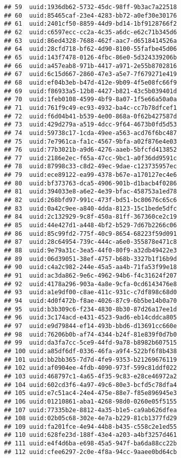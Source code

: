 \documentclass[
]{article}
\begin{document}
\begin{verbatim}
## 59  uuid:1936db62-5732-45dc-98ff-9b3ac7a22518
## 60  uuid:85465caf-23e4-4283-bb72-a0ef30e30176
## 61  uuid:2401cf50-8859-44d9-bd14-1bf9128766f2
## 62  uuid:c6597ecc-cc2a-4c35-a6dc-e62c71b345d6
## 63  uuid:86ed4328-7688-462f-aac7-d6518414526a
## 64  uuid:28cfd718-bf62-4d90-8100-55fafbe45d06
## 65  uuid:143f7478-0126-4fbc-86e0-5d324339206b
## 66  uuid:a457eab8-971b-4417-a971-2e55b8702816
## 67  uuid:6c15d667-2860-47e3-a5e7-7f679271e419
## 68  uuid:ef04b3eb-b47d-412e-9b09-4f5e08fc66f9
## 69  uuid:f86933a5-12b8-4427-b821-43c5b039401d
## 70  uuid:1feb0108-4599-4bf9-8a07-1f5e66a50a0a
## 71  uuid:761f9c49-ec93-4932-ba4c-cc7b78dfcef1
## 72  uuid:f6d04b41-b539-4e00-868a-0f62b427587d
## 73  uuid:429d279a-a519-4dcc-9f64-4673b0fd5d53
## 74  uuid:59738c17-1cda-49ee-a563-acd76f6bc487
## 75  uuid:7e7961ca-fa1c-4567-9bfa-a02f876e4e03
## 76  uuid:77b3021b-a9d6-4276-aaeb-5bfcfd413852
## 77  uuid:2186e2ec-f65a-47cc-9bc1-a0f36dd9591c
## 78  uuid:87998c33-c8d2-49ec-9dae-c123735957ec
## 79  uuid:ece89122-ea99-4378-b67e-a170127ec4e6
## 80  uuid:bf373763-dca5-4906-901b-d1bacb4f0286
## 81  uuid:394033e8-a6e2-4e39-bfac-458753a1ed78
## 82  uuid:268bfd97-991c-473f-bd51-bc80676c65c6
## 83  uuid:0a42c9ee-a840-4dda-8123-15c1bede5dfc
## 84  uuid:2c132929-9c8f-450a-81ff-367360ce2c19
## 85  uuid:44e427d1-a448-4bf2-b529-7d67b2266c06
## 86  uuid:85c99fd2-775f-40c9-8654-68223f59d091
## 87  uuid:28c64954-739c-444c-a6e0-355878e471c8
## 88  uuid:9e79a31c-3ea5-44f0-80f9-a32db49422e3
## 89  uuid:06d39051-38ef-4757-b68b-3327b1f16b9d
## 90  uuid:c4a2c982-244e-45a5-aa4b-71fa53f99e18
## 91  uuid:ac3da862-9e6c-4962-94b6-f4c31624f207
## 92  uuid:4178a296-903a-4a8e-9cfa-0cd6143476e8
## 93  uuid:a1e9df00-c8ae-411c-931c-c7df898c68d0
## 94  uuid:4d0f472b-f8ae-4026-87c9-6b5be14b0a70
## 95  uuid:b3b309c6-f234-4830-8b30-87d26a17ee1d
## 96  uuid:3c174acd-e431-4523-9ad6-eb14cddca805
## 97  uuid:e9d79844-ef14-493b-bbd6-d13691cc660e
## 98  uuid:76206b0b-af74-4344-b24f-81e839f0d7b0
## 99  uuid:da3fa7cc-5ce9-44fd-9a78-b8982b607515
## 100 uuid:a85df6df-0336-46fa-a9f4-522bf6f8b438
## 101 uuid:bb2bb365-7d7d-4fe9-9353-b21269676119
## 102 uuid:af0904ee-4fdb-4090-973f-599c81ddf022
## 103 uuid:468797c1-4a65-4f35-9c83-e28ce46972a2
## 104 uuid:602cd3f6-4a97-49c6-80e3-bcfd5c78dfa4
## 105 uuid:e7c51ac4-24e4-475e-88e7-f85e896945e3
## 106 uuid:01210861-aba1-4268-98d0-0260e05f5155
## 107 uuid:77335b2e-8812-4a35-b1e5-ca9ab626dfea
## 108 uuid:02b05c68-302e-4e7a-b229-81cb1377fd29
## 109 uuid:fa201fce-4e94-44b8-b435-c558c2e1ed55
## 110 uuid:628fe23d-188f-43e4-a203-a4bf3257d461
## 111 uuid:e4f4d6ba-e698-45a5-947f-ba6da88cc22b
## 112 uuid:cfee6297-2c0e-4f8a-94cc-9aaee0bd64cb

\end{verbatim}
\end{document}
